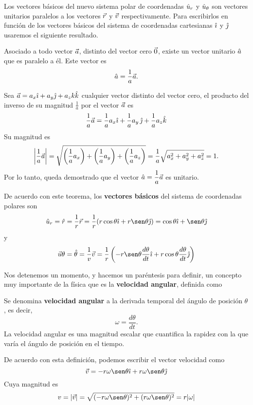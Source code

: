 Los vectores básicos del nuevo sistema polar de coordenadas $\hat{u}_r$ y $\hat{u}_\theta$ son vectores unitarios paralelos a los vectores $\vec{r}$ y $\vec{v}$ respectivamente. Para escribirlos en función de los vectores básicos del sistema de coordenadas cartesianas $\hat{\imath}$ y $\hat{\jmath}$ usaremos el siguiente resultado.
\begin{theorem}{}{}
    Asociado a todo vector $\vec{a}$, distinto del vector cero $\vec{0}$, existe un vector unitario $\hat{a}$ que es paralelo a él. Este vector es
    $$\hat{a} = \frac{1}{a}\vec{a}.$$
    \begin{demo}
        Sea $\vec{a} = a_x\hat{\imath} + a_y\hat{\jmath} + a_zk\hat{k}$ cualquier vector distinto del vector cero, el producto del inverso de su magnitud $\frac{1}{a}$ por el vector $\vec{a}$ es
        $$\frac{1}{a}\vec{a} = \frac{1}{a}a_x\hat{\imath} + \frac{1}{a}a_y\,\hat{\jmath} + \frac{1}{a}a_z\hat{k}$$
        Su magnitud es
        $$\left|\frac{1}{a}\vec{a}\right| = \sqrt{\left(\frac{1}{a}a_x\right) + \left(\frac{1}{a}a_y\right) + \left(\frac{1}{a}a_z\right)} = \frac{1}{a}\sqrt{a_x^2 + a_y^2 + a_z^2} = 1.$$
        Por lo tanto, queda demostrado que el vector $\hat{a} = \dfrac{1}{a}\vec{a}$ es unitario.
    \end{demo}
\end{theorem}

De acuerdo con este teorema, los \textbf{vectores básicos} del sistema de coordenadas polares son
$$\vecu_r =  \runi = \frac{1}{r}\vecr = \frac{1}{r}(r\cos\theta\veci + r\sen\theta\vecj) = \cos\theta\veci + \sen\theta\vecj$$
y
$$\velou\theta = \thetau = \frac{1}{v}\veloi = \frac{1}{r}\left(-r\sen\theta\frac{d\theta}{dt}\veci + r\cos\theta\frac{d\theta}{dt}\vecj\right)$$

Nos detenemos un momento, y hacemos un paréntesis para definir, un concepto muy importante de
la física que es la \textbf{velocidad angular}, definida como
\begin{definition}{}{}
    Se denomina \textbf{velocidad angular} a la derivada temporal del ángulo de posición $\theta$, es decir,
    \begin{equation*}
        \omega = \frac{d\theta}{dt}.
    \end{equation*}
    La velocidad angular es una magnitud escalar que cuantifica la rapidez con la que varía el ángulo de posición en el tiempo.
\end{definition}

De acuerdo con esta definición, podemos escribir el vector velocidad como
$$\veloi = -r\omega\sen\theta\veci + r\omega\sen\theta\vecj$$
Cuya magnitud es
$$v = |\veloi| = \sqrt{(-r\omega\sen\theta)^2 + (r\omega\sen\theta)^2} = r|\omega|$$

